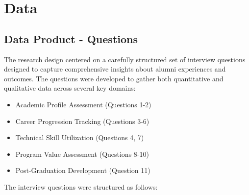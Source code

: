 \documentclass[12pt,a4paper]{article}
\begin{document}
\newpage

\section{Data}
\subsection{Data Product - Questions}
The research design centered on a carefully structured set of interview questions designed to capture comprehensive insights about alumni experiences and outcomes. The questions were developed to gather both quantitative and qualitative data across several key domains:
\begin{itemize}
\item Academic Profile Assessment (Questions 1-2)
\item Career Progression Tracking (Questions 3-6)
\item Technical Skill Utilization (Questions 4, 7)
\item Program Value Assessment (Questions 8-10)
\item Post-Graduation Development (Question 11)
\end{itemize}
The interview questions were structured as follows:
\end{document}
